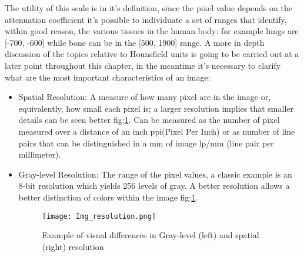 The utility of this scale is in it's definition, since the pixel value depends on the attenuation coefficient it's possible to individuate a set of ranges that identify, within good reason, the various  tissues in the human body: for example lungs are [-700, -600] while bone can be in the [500, 1900] range.
A more in depth discussion of the topics relative to Hounsfield units is going to be carried out at a later point throughout this chapter, in the meantime it's necessary to clarify what are the most important characteristics of an image:

\begin{itemize}
\item Spatial Resolution: A measure of how many pixel are in the image or, equivalently, how small each pixel is; a larger resolution implies that smaller details can be seen better fig:\ref{fig:resolution_types}. Can be measured as the number of pixel measured over a distance of an inch ppi(Pixel Per Inch) or as number of line pairs that can be distinguished in a mm of image lp/mm (line pair per millimeter).
\item Gray-level Resolution: The range of the pixel values, a classic example is an 8-bit resolution which yields 256 levels of gray. A better resolution allows a better distinction of colors within the image fig:\ref{fig:resolution_types}.

\begin{figure}[H]
  		\texttt{[image: Img\_resolution.png]}
        \caption{Example of visual differences in Gray-level (left) and spatial (right) resolution \label{fig:resolution_types}}
\end{figure}


\end{itemize}
